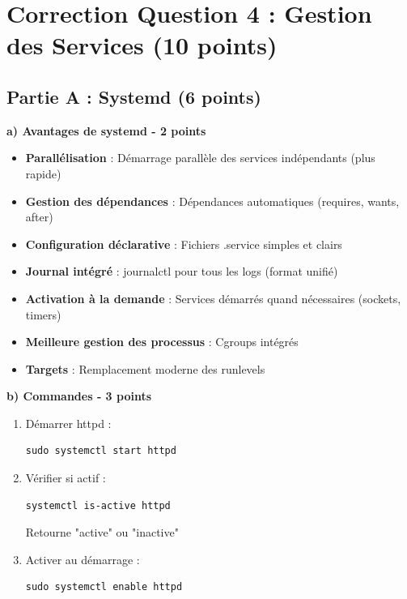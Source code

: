 \documentclass[12pt,a4paper]{article}
\begin{document}
\section{Correction Question 4 : Gestion des Services (10 points)}

\subsection*{Partie A : Systemd (6 points)}

\begin{answerbox}
\textbf{a) Avantages de systemd - 2 points}

\begin{itemize}
    \item \textbf{Parallélisation} : Démarrage parallèle des services indépendants (plus rapide)
    \item \textbf{Gestion des dépendances} : Dépendances automatiques (requires, wants, after)
    \item \textbf{Configuration déclarative} : Fichiers .service simples et clairs
    \item \textbf{Journal intégré} : journalctl pour tous les logs (format unifié)
    \item \textbf{Activation à la demande} : Services démarrés quand nécessaires (sockets, timers)
    \item \textbf{Meilleure gestion des processus} : Cgroups intégrés
    \item \textbf{Targets} : Remplacement moderne des runlevels
\end{itemize}

\textbf{b) Commandes - 3 points}

\begin{enumerate}
    \item Démarrer httpd :
    \begin{lstlisting}
sudo systemctl start httpd
    \end{lstlisting}
    
    \item Vérifier si actif :
    \begin{lstlisting}
systemctl is-active httpd
    \end{lstlisting}
    Retourne "active" ou "inactive"
    
    \item Activer au démarrage :
    \begin{lstlisting}
sudo systemctl enable httpd
    \end{lstlisting}
    

\end{enumerate}
\end{answerbox}
\end{document}
